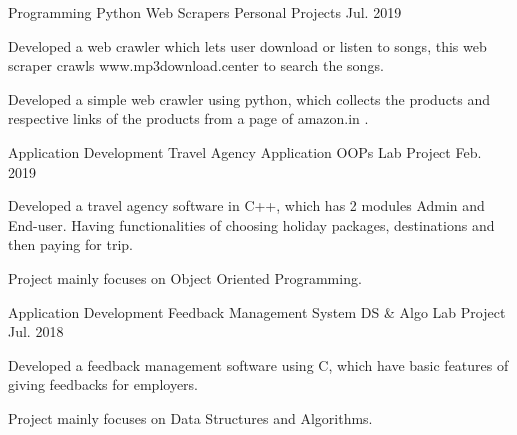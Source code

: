 \begin{cventries}
  \cventry
    {Programming} %
    {Python Web Scrapers} %
    {Personal Projects} %
    {Jul. 2019} %
    {
      \begin{cvitems} %
        \item {Developed a web crawler which lets user download or listen to songs, this web scraper crawls www.mp3download.center to search the songs.}
        \item {Developed a simple web crawler using python, which collects the products and respective links of the products from a page of amazon.in .}
      \end{cvitems}
    }

  \cventry
    {Application Development} %
    {Travel Agency Application} %
    {OOPs Lab Project} %
    {Feb. 2019} %
    {
      \begin{cvitems} %
        \item {Developed a travel agency software in C++, which has 2 modules Admin and End-user. Having functionalities of choosing holiday packages, destinations and then paying for trip.}
        \item {Project mainly focuses on Object Oriented Programming.}
      \end{cvitems}
    }

  \cventry
    {Application Development} %
    {Feedback Management System} %
    {DS & Algo Lab Project} %
    {Jul. 2018} %
    {
      \begin{cvitems} %
        \item {Developed a feedback management software using C, which have basic features of giving feedbacks for employers.}
        \item {Project mainly focuses on Data Structures and Algorithms.}
      \end{cvitems}
    }

\end{cventries}
